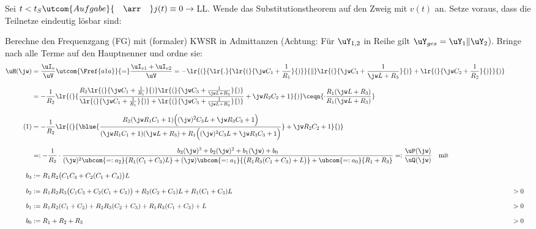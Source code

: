 \documentclass[ngerman,10pt,a4paper]{article}%
\begin{document}
%
\thispagestyle{empty}%

%
\allowdisplaybreaks
\reversemarginpar
\newcommand{\numberthis}[1]{%
	\stepcounter{equation}\tag{\theequation}\label{#1}%
}%
%
%
Sei $t<t_S\utcom{Aufgabe}{\quad\arr\quad} j(t)\equiv0\rightarrow\:$LL. Wende das Substitutionstheorem auf den Zweig mit $v(t)$ an. Setze voraus, dass die Teilnetze eindeutig lösbar sind:
%

\noindent Berechne den Frequenzgang (FG) mit (formaler) KWSR in Admittanzen (Achtung: Für $\uY_{1,2}$ in Reihe gilt $\uY_{ges}=\uY_1\|\uY_2$). Bringe nach  alle Terme auf den Hauptnenner und ordne sie:
%
\begin{align*}
	\uH(\jw)&=\frac{\uI_v}{\uV}\utcom{\Fref{a1a}}{=}\frac{\uI_{v1}+\uI_{v2}}{\uV}=-\lr{(}{%
		\lr{.}{\lr{(}{%
			\jw C_1+\frac{1}{R_1}%
		}{)}}{\|}\lr{(}{%
			\jw C_3+\frac{1}{\jw L + R_3}%
		}{)}+\lr{(}{%
			\jw C_2+\frac{1}{R_2}%
		}{)}%
	}{)}\\[2.5mm]%
%
	&=-\frac{1}{R_2}\lr{(}{%
		\frac{%
			R_2\lr{(}{%
				\jw C_1+\frac{1}{R_1}%
			}{)}\lr{(}{%
				\jw C_3+\frac{1}{\jw L + R_3}%
			}{)}%
		}{%
			\lr{(}{%
				\jw C_1+\frac{1}{R_1}%
			}{)} + \lr{(}{%
				\jw C_3+\frac{1}{\jw L + R_3}%
			}{)}%
		} + \jw R_2C_2+1%
	}{)}\ceqn{%
		\cdot\frac{R_1(\jw L+R_3)}{R_1(\jw L+R_3)}%
	}\\[2.5mm]%
%
	\numberthis{a1a_FG_mult}&=-\frac{1}{R_2}\lr{(}{%
		\blue{\frac{%
			R_2(\jw R_1C_1+1)\Bigl((\jw)^2C_3L+\jw R_3C_3+1\Bigr)%
		}{%
			(\jw R_1C_1+1)(\jw L+R_3)+R_1\Bigl((\jw)^2C_3L+\jw R_3C_3+1\Bigr)%
		}} + \jw R_2C_2+1%
	}{)}\\[2.5mm]%
%
	&=:-\frac{1}{R_2}\cdot\frac{%
		b_3(\jw)^3+b_2(\jw)^2+b_1(\jw) +b_0%
	}{%
		(\jw)^2\ubcom{=:a_2}{%
			R_1(C_1+C_3)L%
		}+(\jw)\ubcom{=:a_1}{%
			\bigl(R_1R_3(C_1+C_3)+L\bigr)%
		}+\ubcom{=:a_0}{R_1+R_3}%
	}=:\frac{\uP(\jw)}{\uQ(\jw)}\quad\text{mit}\\[2.5mm]%
%
	b_3&:=R_1R_2\bigl(C_1C_3+C_2(C_1+C_3)\bigr)L&&\\[2.5mm]%
	b_2&:=R_1R_2R_3\bigl(C_1C_3+C_2(C_1+C_3)\bigr)+R_2(C_2+C_3)L+R_1(C_1+C_3)L&&>0\\[2.5mm]%
	b_1&:=R_1R_2(C_1+C_2)+R_2R_3(C_2+C_3)+R_1R_3(C_1+C_3)+L&&>0\\[2.5mm]%
	b_0&:=R_1+R_2+R_3&&>0%
\end{align*}%
\end{document}
